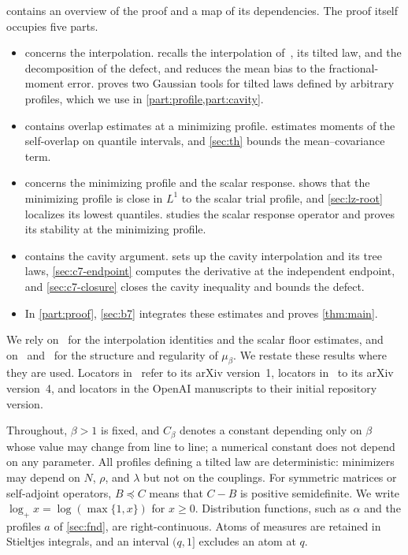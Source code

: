  contains an overview of the proof and a map of its
dependencies. The proof itself occupies five parts.
\begin{itemize}
\item {} concerns the interpolation.
 recalls the interpolation of~\cite{AL}, its tilted law,
and the decomposition of the defect, and reduces the mean bias to
the fractional-moment error.  proves two Gaussian tools
for tilted laws defined by arbitrary profiles, which we use in
\cref{part:profile,part:cavity}.
\item {} contains overlap estimates at a minimizing
profile.  estimates moments of the self-overlap on
quantile intervals, and \cref{sec:th} bounds the mean--covariance term.
\item {} concerns the minimizing profile and the scalar
response.  shows that the minimizing profile is close in
$L^1$ to the scalar trial profile, and \cref{sec:lz-root} localizes its
lowest quantiles.  studies the scalar response operator and
proves its stability at the minimizing profile.
\item {} contains the cavity argument. 
sets up the cavity interpolation and its tree laws,
\cref{sec:c7-endpoint} computes the derivative at the independent
endpoint, and \cref{sec:c7-closure} closes the cavity inequality and
bounds the defect.
\item In \cref{part:proof}, \cref{sec:b7} integrates these estimates and
proves \cref{thm:main}.
\end{itemize}

We rely on~\cite{AL} for the interpolation identities and the scalar
floor estimates, and on~\cite{Lopatto} and~\cite{AuffingerChen2015Properties}
for the structure and regularity of $\mu_\beta$. We restate these
results where they are used. Locators in~\cite{AL} refer to its arXiv
version~1, locators in~\cite{Lopatto} to its arXiv version~4, and
locators in the OpenAI manuscripts to their initial repository version.

Throughout, $\beta>1$ is fixed, and $C_\beta$ denotes a constant
depending only on $\beta$ whose value may change from line to line; a
numerical constant does not depend on any parameter. All profiles defining a tilted law are
deterministic: minimizers may depend on $N$, $\rho$, and $\lambda$ but
not on the couplings. For symmetric matrices or self-adjoint operators,
$B\preceq C$ means that $C-B$ is positive semidefinite. We write
$\log_+x=\log(\max\{1,x\})$ for $x\ge0$. Distribution functions, such
as $\alpha$ and the profiles $a$ of \cref{sec:fnd}, are
right-continuous. Atoms of measures are retained in Stieltjes
integrals, and an interval $(q,1]$ excludes an atom at $q$.
